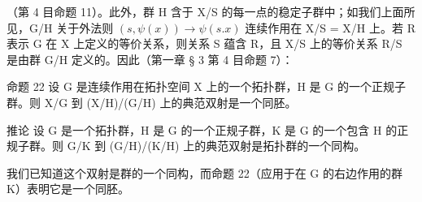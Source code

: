 （第 4 目命题 11）。此外，群 H 含于 X/S 的每一点的稳定子群中；如我们上面所见，G/H 关于外法则 \((s, \psi(x)) \to \psi(s.x)\) 连续作用在 X/S = X/H 上。若 R 表示 G 在 X 上定义的等价关系，则关系 S 蕴含 R，且 X/S 上的等价关系 R/S 是由群 G/H 定义的。因此（第一章 § 3 第 4 目命题 7）：

命题 22 设 G 是连续作用在拓扑空间 X 上的一个拓扑群，H 是 G 的一个正规子群。则 X/G 到 (X/H)/(G/H) 上的典范双射是一个同胚。

推论 设 G 是一个拓扑群，H 是 G 的一个正规子群，K 是 G 的一个包含 H 的正规子群。则 G/K 到 (G/H)/(K/H) 上的典范双射是拓扑群的一个同构。

我们已知道这个双射是群的一个同构，而命题 22（应用于在 G 的右边作用的群 K）表明它是一个同胚。

